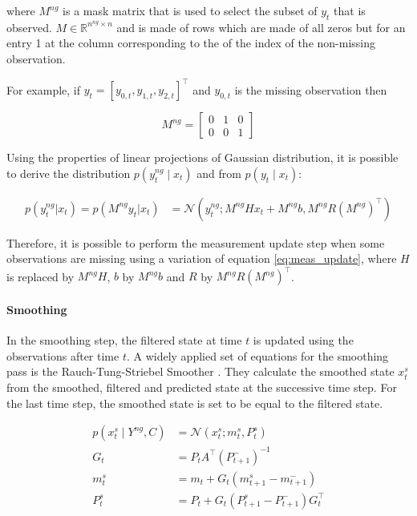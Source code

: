 \documentclass{article}
\newcommand{\norm}[3]{\mathcal{N}\left(#1; #2, #3\right)} %
\begin{document}
where $M^{ng}$ is a mask matrix that is used to select the subset of $y_t$ that is observed. $M \in \mathbb{R}^{n^{ng} \times n}$ and is made of rows which are made of all zeros but for an entry 1 at the column corresponding to the of the index of the non-missing observation.

For example, if $y_t = [y_{0,t}, y_{1,t}, y_{2,t}]^\top$ and $y_{0,t}$ is the missing observation then

\begin{equation*}
 M^{ng} = \left[\begin{array}{ccc}
    0 & 1 & 0 \\
    0 & 0 & 1
\end{array}\right]
\end{equation*}

Using the properties of linear projections of Gaussian distribution, it is possible to derive the distribution $p(y^{ng}_t \mid x_t)$ and from $p(y_t \mid x_t)$: 
 
\begin{align*}
   p(y^{ng}_t|x_t) = p(M^{ng}y_t|x_t) &=   \norm{y^{ng}_t}{M^{ng}Hx_t + M^{ng}b}{M^{ng}R(M^{ng})^\top}%
\end{align*}

Therefore, it is possible to perform the measurement update step when some observations are missing using a variation of equation \ref{eq:meas_update}, where $H$ is replaced by $M^{ng}H$, $b$ by $M^{ng}b$ and $R$ by $M^{ng}R(M^{ng})^\top$.

\paragraph{Smoothing}

In the smoothing step, the filtered state at time $t$ is updated using the observations after time $t$. A widely applied set of equations for the smoothing pass is the Rauch-Tung-Striebel Smoother \cite{rauch_maximum_1965}. They calculate the smoothed state $x_t^s$ from the smoothed, filtered and predicted state at the successive time step.
For the last time step, the smoothed state is set to be equal to the filtered state.

\begin{align*}
    p(x_t^s \mid Y^{ng}, C) &= \norm{x_t^s}{m_t^s}{P_t^s} \\
    G_t &= P_tA^\top(P_{t+1}^-)^{-1}\\
    m_t^s &= m_t + G_t(m_{t+1}^s - m_{t+1}^-) \\
    P_t^s &= P_t + G_t(P_{t+1}^s - P_{t+1}^-)G_t^\top 
\end{align*}
\end{document}
